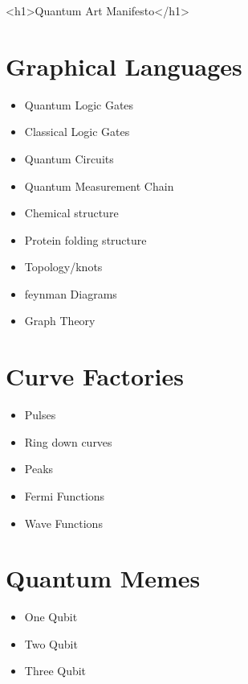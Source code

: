 \documentclass[11pt]{article}
\begin{document}
<h1>Quantum Art Manifesto</h1>


\section{
Graphical Languages}
\begin{itemize}

    \item
Quantum Logic Gates
    \item
Classical Logic Gates
    \item
Quantum Circuits
    \item
Quantum Measurement Chain
    \item
Chemical structure
    \item
Protein folding structure
    \item
Topology/knots
    \item
feynman Diagrams
    \item
Graph Theory
\end{itemize}

\section{
Curve Factories}
\begin{itemize}

    \item
Pulses
    \item
Ring down curves
    \item
Peaks
    \item
Fermi Functions
    \item
Wave Functions
\end{itemize}

\section{
Quantum Memes}
\begin{itemize}

    \item
One Qubit
    \item
Two Qubit
    \item
Three Qubit
\end{itemize}
\end{document}
